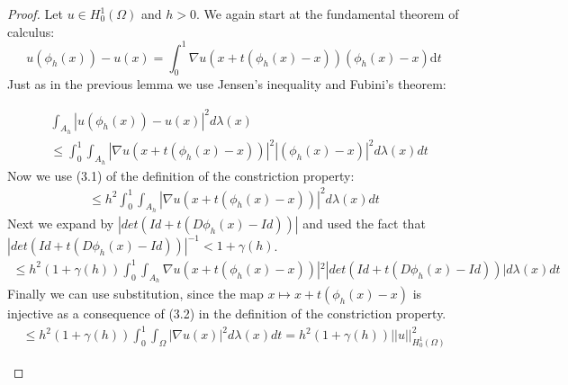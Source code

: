 \documentclass[11pt,a4paper,leqno]{report}
\numberwithin{equation}{chapter}
\begin{document}
\begin{proof}
Let $u\in H^1_0(\Omega)$ and $h>0$. We again start at the fundamental theorem of calculus:
\begin{equation*} u(\phi_h(x))-u(x)=\int_0^1\nabla u(x+t(\phi_h(x)-x))(\phi_h(x)-x)\mathrm{d}t\end{equation*}
Just as in the previous lemma we use Jensen's inequality and Fubini's theorem:
\begin{small}
\begin{align*}&\int_{A_h}|u(\phi_h(x))-u(x)|^2d\lambda(x)\\& \leq \int_0^1\int_{A_h}|\nabla u(x+t(\phi_h(x)-x))|^2|(\phi_h(x)-x)|^2d\lambda(x)dt\end{align*}
Now we use (3.1) of the definition of the constriction property:
\begin{align*}\leq h^2\int_0^1\int_{A_h}|\nabla u(x+t(\phi_h(x)-x))|^2d\lambda(x)dt\end{align*}
Next we expand by $|det(Id+t(D\phi_h(x)-Id))|$ and used the fact that $|det(Id+t(D\phi_h(x)-Id))|^{-1}<1+\gamma(h)$.
\begin{align*}\leq h^2(1+\gamma(h))\int_0^1\int_{A_h}\nabla u(x+t(\phi_h(x)-x))|^2|det(Id+t(D\phi_h(x)-Id))|d\lambda(x)dt\end{align*}
Finally we can use substitution, since the map $x\mapsto x+t(\phi_h(x)-x)$ is injective as a consequence of (3.2) in the definition of the constriction property.
\begin{align*}\leq h^2(1+\gamma(h))\int_0^1\int_{\Omega}|\nabla u(x)|^2d\lambda(x)dt=h^2(1+\gamma(h))||u||_{H^1_0(\Omega)}^2
\end{align*}
\end{small}
\end{proof}
\end{document}
